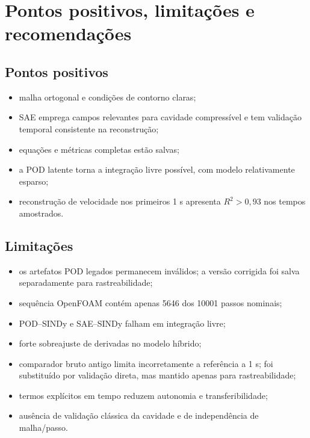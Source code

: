 \documentclass[12pt,a4paper]{article}
\begin{document}
\section{Pontos positivos, limitações e recomendações}
\subsection*{Pontos positivos}
\begin{itemize}
\item malha ortogonal e condições de contorno claras;
\item SAE emprega campos relevantes para cavidade compressível e tem validação temporal consistente na reconstrução;
\item equações e métricas completas estão salvas;
\item a POD latente torna a integração livre possível, com modelo relativamente esparso;
\item reconstrução de velocidade nos primeiros 1 s apresenta $R^2>0,93$ nos tempos amostrados.
\end{itemize}
\subsection*{Limitações}
\begin{itemize}
\item os artefatos POD legados permanecem inválidos; a versão corrigida foi salva separadamente para rastreabilidade;
\item sequência OpenFOAM contém apenas 5646 dos 10001 passos nominais;
\item POD--SINDy e SAE--SINDy falham em integração livre;
\item forte sobreajuste de derivadas no modelo híbrido;
\item comparador bruto antigo limita incorretamente a referência a 1 s; foi substituído por validação direta, mas mantido apenas para rastreabilidade;
\item termos explícitos em tempo reduzem autonomia e transferibilidade;
\item ausência de validação clássica da cavidade e de independência de malha/passo.
\end{itemize}
\end{document}
